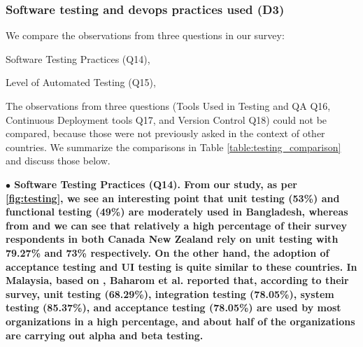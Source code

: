 \subsubsection{Software testing and devops practices used (D3)}\label{sec:rq2-d3}
We compare the observations from three questions in our survey: \begin{inparaenum}
\item Software Testing Practices (Q14),
\item Level of Automated Testing (Q15),
\end{inparaenum} The observations from three questions (Tools Used in Testing and QA Q16, Continuous Deployment tools Q17, and Version Control Q18) could not be compared, because 
those were not previously asked in the context of other countries. We summarize the comparisons in Table \ref{table:testing_comparison} and discuss those below.


\nd\bf{$\bullet$ Software Testing Practices (Q14)}. From our study, as per
\ref{fig:testing}, we see an interesting point that unit testing (53\%) and
functional testing (49\%) are moderately used in Bangladesh, whereas from
\citep{Garousi2013} and \citep{Wang2018} we can see that relatively a high
percentage of their survey respondents in both Canada New Zealand rely on unit
testing with 79.27\% and 73\% respectively. On the other hand, the adoption of
acceptance testing and UI testing is quite similar to these countries. In
Malaysia, based on \citep{Baharom2006}, Baharom et al. reported that, according
to their survey, unit testing (68.29\%), integration testing (78.05\%), system
testing (85.37\%), and acceptance testing (78.05\%) are used by most
organizations in a high percentage, and about half of the organizations are
carrying out alpha and beta testing.

